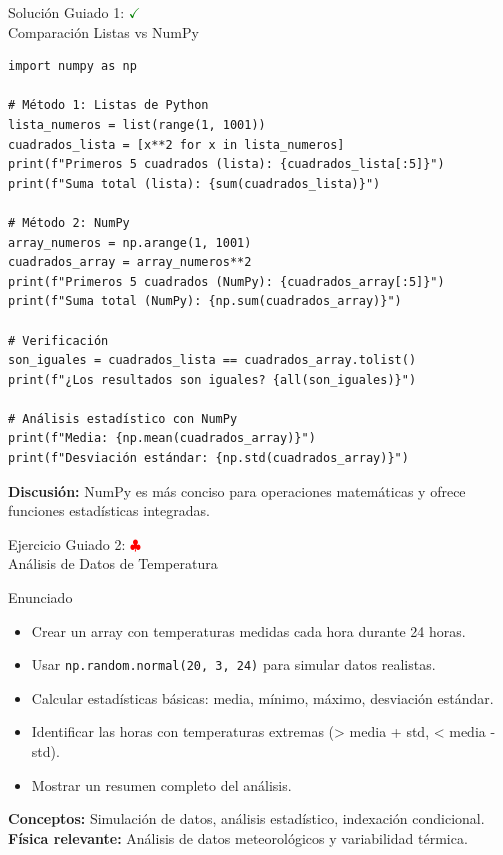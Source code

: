 \documentclass[10pt]{beamer}
\begin{document}
\begin{solutionblock}
\begin{frame}[fragile]{Solución Guiado 1: \hfill \textcolor{green}{$\checkmark$} \\ Comparación Listas vs NumPy}
\begin{verbatim}
import numpy as np

# Método 1: Listas de Python
lista_numeros = list(range(1, 1001))
cuadrados_lista = [x**2 for x in lista_numeros]
print(f"Primeros 5 cuadrados (lista): {cuadrados_lista[:5]}")
print(f"Suma total (lista): {sum(cuadrados_lista)}")

# Método 2: NumPy
array_numeros = np.arange(1, 1001)
cuadrados_array = array_numeros**2
print(f"Primeros 5 cuadrados (NumPy): {cuadrados_array[:5]}")
print(f"Suma total (NumPy): {np.sum(cuadrados_array)}")

# Verificación
son_iguales = cuadrados_lista == cuadrados_array.tolist()
print(f"¿Los resultados son iguales? {all(son_iguales)}")

# Análisis estadístico con NumPy
print(f"Media: {np.mean(cuadrados_array)}")
print(f"Desviación estándar: {np.std(cuadrados_array)}")
\end{verbatim}
\textbf{Discusión:} NumPy es más conciso para operaciones matemáticas y ofrece funciones estadísticas integradas.
\end{frame}
\end{solutionblock}

\begin{frame}{Ejercicio Guiado 2: \hfill \textcolor{red}{$\clubsuit$} \\ Análisis de Datos de Temperatura}
  \begin{block}{Enunciado}
    \begin{itemize}
      \item Crear un array con temperaturas medidas cada hora durante 24 horas.
      \item Usar \texttt{np.random.normal(20, 3, 24)} para simular datos realistas.
      \item Calcular estadísticas básicas: media, mínimo, máximo, desviación estándar.
      \item Identificar las horas con temperaturas extremas (> media + std, < media - std).
      \item Mostrar un resumen completo del análisis.
    \end{itemize}
  \end{block}
  
  \textbf{Conceptos:} Simulación de datos, análisis estadístico, indexación condicional.
  \\
  \textbf{Física relevante:} Análisis de datos meteorológicos y variabilidad térmica.
\end{frame}
\end{document}
